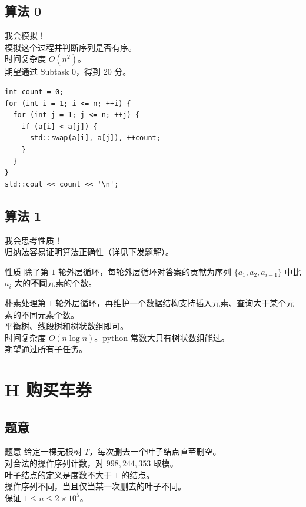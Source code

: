 \documentclass[11pt, fontset = fandol]{ctexbeamer}
\begin{document}
\subsection{算法 0}
\begin{frame}[fragile]
  我会模拟！\\
  \pause
  模拟这个过程并判断序列是否有序。\\
  \pause
  时间复杂度 $O(n^2)$。\\
  \pause
  期望通过 Subtask 0，得到 20 分。\\
  \pause

  \begin{lstlisting}
int count = 0;
for (int i = 1; i <= n; ++i) {
  for (int j = 1; j <= n; ++j) {
    if (a[i] < a[j]) {
      std::swap(a[i], a[j]), ++count;
    }
  }
}
std::cout << count << '\n';
  \end{lstlisting}

\end{frame}

\subsection{算法 1}

\begin{frame}[fragile]
  我会思考性质！\\
  \pause
  归纳法容易证明算法正确性（详见下发题解）。\\
  \pause
  \begin{block}{性质}
    除了第 $ 1 $ 轮外层循环，每轮外层循环对答案的贡献为序列 $ \{ a_1, a_2, a_{i - 1} \} $ 中比 $ a_i $ 大的\textbf{不同}元素的个数。
  \end{block}
  \pause
  朴素处理第 $1$ 轮外层循环，再维护一个数据结构支持插入元素、查询大于某个元素的不同元素个数。\\
  \pause
  平衡树、线段树和树状数组即可。\\
  \pause
  时间复杂度 $O(n \log n)$。python 常数大只有树状数组能过。\\
  \pause
  期望通过所有子任务。

\end{frame}

\section{H 购买车券}
\subsection{题意}
\begin{frame}
  \begin{block}{题意}
    给定一棵无根树 $T$，每次删去一个叶子结点直至删空。\\
    对合法的操作序列计数，对 $998,244,353$ 取模。\\
    叶子结点的定义是度数不大于 $1$ 的结点。\\
    操作序列不同，当且仅当某一次删去的叶子不同。\\
    保证 $1 \le n \le 2 \times {10}^5$。\\
  \end{block}
\end{frame}
\end{document}

